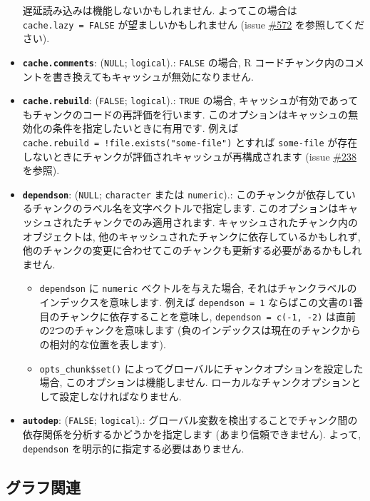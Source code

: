 \documentclass[
]{bxjsreport}
\providecommand{\tightlist}{%
  \setlength{\itemsep}{0pt}\setlength{\parskip}{0pt}}
\begin{document}
\begin{itemize}
  遅延読み込みは機能しないかもしれません. よってこの場合は
  \texttt{cache.lazy\ =\ FALSE} が望ましいかもしれません (issue
  \href{https://github.com/yihui/knitr/issues/572}{\#572}
  を参照してください).
\item
  \textbf{\texttt{cache.comments}}: (\texttt{NULL}; \texttt{logical}).:
  \texttt{FALSE} の場合, R
  コードチャンク内のコメントを書き換えてもキャッシュが無効になりません.
\item
  \textbf{\texttt{cache.rebuild}}: (\texttt{FALSE}; \texttt{logical}).:
  \texttt{TRUE} の場合,
  キャッシュが有効であってもチャンクのコードの再評価を行います.
  このオプションはキャッシュの無効化の条件を指定したいときに有用です.
  例えば \texttt{cache.rebuild\ =\ !file.exists("some-file")} とすれば
  \texttt{some-file}
  が存在しないときにチャンクが評価されキャッシュが再構成されます (issue
  \href{https://github.com/yihui/knitr/issues/238}{\#238} を参照).
\item
  \textbf{\texttt{dependson}}: (\texttt{NULL}; \texttt{character} または
  \texttt{numeric}).:
  このチャンクが依存しているチャンクのラベル名を文字ベクトルで指定します.
  このオプションはキャッシュされたチャンクでのみ適用されます.
  キャッシュされたチャンク内のオブジェクトは,
  他のキャッシュされたチャンクに依存しているかもしれず,
  他のチャンクの変更に合わせてこのチャンクも更新する必要があるかもしれません.

  \begin{itemize}
  \tightlist
  \item
    \texttt{dependson} に \texttt{numeric} ベクトルを与えた場合,
    それはチャンクラベルのインデックスを意味します. 例えば
    \texttt{dependson\ =\ 1}
    ならばこの文書の1番目のチャンクに依存することを意味し,
    \texttt{dependson\ =\ c(-1,\ -2)} は直前の2つのチャンクを意味します
    (負のインデックスは現在のチャンクからの相対的な位置を表します).
  \item
    \texttt{opts\_chunk\$set()}
    によってグローバルにチャンクオプションを設定した場合,
    このオプションは機能しません.
    ローカルなチャンクオプションとして設定しなければなりません.
  \end{itemize}
\item
  \textbf{\texttt{autodep}}: (\texttt{FALSE}; \texttt{logical}).:
  グローバル変数を検出することでチャンク間の依存関係を分析するかどうかを指定します
  (あまり信頼できません). よって, \texttt{dependson}
  を明示的に指定する必要はありません.
\end{itemize}

\hypertarget{plots}{%
\subsection{グラフ関連}\label{plots}}
\end{document}
